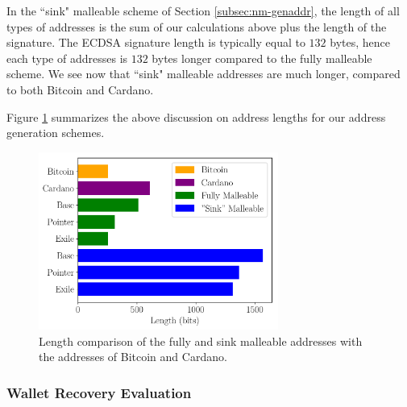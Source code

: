 In the ``sink" malleable scheme of Section \ref{subsec:nm-genaddr}, the length
of all types of addresses is the sum of our calculations above plus the length
of the signature. The ECDSA signature length is typically equal to $132$ bytes,
hence each type of addresses is $132$ bytes longer compared to the fully
malleable scheme. We see now that ``sink" malleable addresses are much longer,
compared to both Bitcoin and Cardano.

Figure \ref{graph:addr_length} summarizes the above discussion on address
lengths for our address generation schemes.

\begin{figure}
  \begin{center}
    \includegraphics[width=0.7\textwidth]{figures/delegation/address_gen.pdf}
  \end{center}
  \caption{Length comparison of the fully and sink malleable addresses with the
    addresses of Bitcoin and Cardano.}
  \label{graph:addr_length}
\end{figure}

\subsubsection{Wallet Recovery Evaluation}\label{sec:recovery-evaluation}

